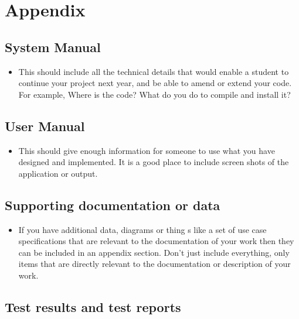 \section{Appendix}
\label{sec:appendix}


\subsection{System Manual}

\begin{mdframed}
	\begin{itemize}
		\item This should include all the technical details that would enable a student to continue your project next year, and be able to amend or extend your code. For example, Where is the code? What do you do to compile and install it?
	\end{itemize}
\end{mdframed}

\subsection{User Manual}

\begin{mdframed}
	\begin{itemize}
		\item This should give enough information for someone to use what you have designed and implemented. It is a good place to include screen shots of the application or output.
	\end{itemize}
\end{mdframed}

\subsection{Supporting documentation or data}

\begin{mdframed}
	\begin{itemize}
		\item If you have additional data, diagrams or thing s like a set of use case specifications that are relevant to the documentation of your work then they can be included in an appendix section. Don't just include everything, only items that are directly relevant to the documentation or description of your work.
	\end{itemize}
\end{mdframed}

\subsection{Test results and test reports}

